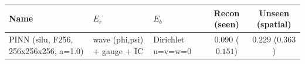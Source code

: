 \begin{center}
\begin{tabular}{lll cc}
\toprule
Name & $E_r$ & $E_b$ & Recon (seen) & Unseen (spatial) \\
\midrule
PINN (silu, F256, 256x256x256, a=1.0) & wave (phi,psi) + gauge + IC & Dirichlet u=v=w=0 & $0.090$ ($0.151$) & $0.229$ ($0.363$) \\
\bottomrule
\end{tabular}
\end{center}
